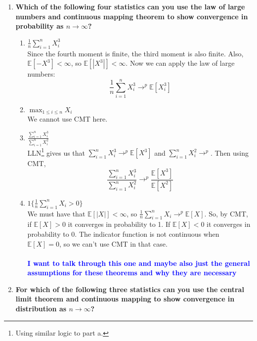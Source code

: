 \documentclass[]{article}
\newcommand{\sumin}{\sum\limits_{i=1}^n} %
\newcommand{\E}{\mathbb{E}}
\newcommand{\fix} [1] {\textbf{\textcolor{blue}{#1}}} %
\begin{document}
\begin{enumerate}[label = (\roman*)]


\item \textbf{Which of the following four statistics can you use the law of large numbers and continuous mapping theorem to show convergence in probability as $n \rightarrow \infty$?}

\begin{enumerate}[label = (\alph*)]

\item  $\frac{1}{n}\sumin X_i^3$ \\
Since the fourth moment is finite, the third moment is also finite. Also, $\E[-X^3] <\infty$, so $\E[|X^3|] <\infty$. Now we can apply the law of large numbers:
\[\frac{1}{n}\sumin X_i^3 \rightarrow^p \E[X_i^3] \]

\item $\max_{1\le i \le n} X_i$ \\
We cannot use CMT here. 

\item $ \frac{\sumin X_i^3}{\sumin X_i^2}$ \\
LLN\footnote{Using similar logic to part a.} gives us that $\sumin X_i^3 \rightarrow^p \E[X^3]$ and $ \sumin X_i^2 \rightarrow^p$. Then using CMT, 
\[\frac{\sumin X_i^3}{\sumin X_i^2} \rightarrow^p \frac{\E[X^3]}{\E[X^2]}\]

\item $ 1 \bigg\{\frac{1}{n}\sumin X_i > 0\bigg\}$ \\
We must have that $\E[|X|] <\infty$, so $\frac{1}{n}\sumin X_i \rightarrow^p \E[X]$. So, by CMT, if $\E[X]>0$ it converges in probability to 1. If $\E[X]<0$ it converges in probability to 0. The indicator function is not continuous when $\E[X]=0$, so we can't use CMT in that case. 
\\\\
\fix{I want to talk through this one and maybe also just the general assumptions for these theorems and why they are necessary}

\end{enumerate}


\item \textbf{For which of the following three statistics can you use the central limit theorem and continuous mapping to show convergence in distribution as $n \rightarrow \infty$?}

\begin{enumerate}[label = (\alph*)]


\end{enumerate}
\end{enumerate}
\end{document}

